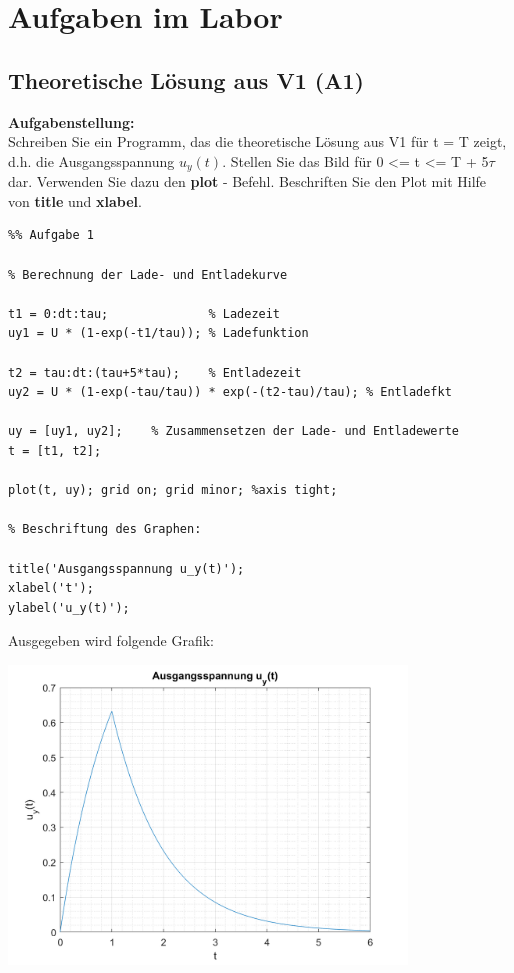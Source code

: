 \chapter{Aufgaben im Labor}
\thispagestyle{fancy}

\section{Theoretische Lösung aus V1 (A1)}

\textbf{Aufgabenstellung:\\}
Schreiben Sie ein Programm, das die theoretische Lösung aus V1 für t = T zeigt, d.h. die Ausgangsspannung $u_y(t)$. Stellen Sie das Bild für 0 <= t <= T + 5$\tau$ dar. Verwenden Sie dazu den \textbf{plot} - Befehl. Beschriften Sie den Plot mit Hilfe von \textbf{title} und \textbf{xlabel}.

\vspace{1.5cm}

\begin{lstlisting}
%% Aufgabe 1

% Berechnung der Lade- und Entladekurve

t1 = 0:dt:tau;              % Ladezeit
uy1 = U * (1-exp(-t1/tau)); % Ladefunktion

t2 = tau:dt:(tau+5*tau);    % Entladezeit
uy2 = U * (1-exp(-tau/tau)) * exp(-(t2-tau)/tau); % Entladefkt

uy = [uy1, uy2];    % Zusammensetzen der Lade- und Entladewerte
t = [t1, t2];

plot(t, uy); grid on; grid minor; %axis tight; 

% Beschriftung des Graphen:

title('Ausgangsspannung u_y(t)');
xlabel('t');
ylabel('u_y(t)');

\end{lstlisting}

\vspace{0.5cm}

\newpage
    
    
Ausgegeben wird folgende Grafik:
\begin{center}
\includegraphics[width=300pt]{img/aufgabe1.png}
\end{center}


